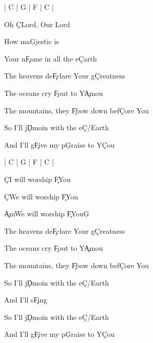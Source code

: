 \documentclass[9pt]{extarticle}
\begin{document}
\bsong

\bi
| C | G | F | C |
\ei

\bv[2]
Oh \c{C}Lord, Our Lord

How ma\c{G}jestic is

Your n\c{F}ame in all the e\c{C}arth
\ev

\bc
The heavens de\c{F}clare Your g\c{C}reatness

The oceans cry \c{F}out to Y\c{Am}ou

The mountains, they \c{F}bow down bef\c{C}ore You

So I'll j\c{Dm}oin with the e\c{C/E}arth

And I'll g\c{F}ive my p\c{G}raise to Y\c{C}ou
\ec

\bin
| C | G | F | C |
\ein



\bb[4]
\c{C}I will worship \c{F}You
\eb

\bb
\c{C}We will worship \c{F}You

\c{Am}We will worship \c{F}You\c{G}
\eb

\bc
The heavens de\c{F}clare Your g\c{C}reatness

The oceans cry \c{F}out to Y\c{Am}ou

The mountains, they \c{F}bow down bef\c{C}ore You

So I'll j\c{Dm}oin with the e\c{C/E}arth

And I'll s\c{F}ing
\ec


\bo[2]
So I'll j\c{Dm}oin with the e\c{C/E}arth

And I'll g\c{F}ive my p\c{G}raise to Y\c{C}ou
\eo

\esong
\end{document}

